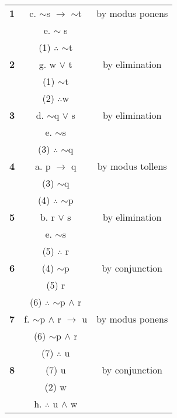 \documentclass{article}
\begin{document}
\begin{center}
	\begin{tabular}{ |c|c|c| } 
		\hline
		\textbf{1}  & c. $\sim$s $\rightarrow$ $\sim$t  & by modus ponens \\ 
					& e. $\sim$ s & \\
					& (1) $\therefore$ $\sim$t & \\
		\hline
		\textbf{2} & g. w $\vee$ t & by elimination \\ 
				   & (1) $\sim$t & \\
				   & (2) $\therefore$w & \\
		\hline
		\textbf{3} & d. $\sim$q $\vee$ s & by elimination \\ 
			 	   & e. $\sim$s & \\
				   & (3) $\therefore$ $\sim$q & \\
		\hline
		\textbf{4} & a. p $\rightarrow$ q & by modus tollens \\ 
				   & (3) $\sim$q & \\
				   & (4) $\therefore$ $\sim$p & \\
		\hline
		\textbf{5} & b. r $\vee$ s & by elimination \\ 
				   & e. $\sim$s & \\
				   & (5) $\therefore$ r & \\
		\hline
		\textbf{6} & (4) $\sim$p & by conjunction \\ 
				   & (5) r & \\
				   & (6) $\therefore$ $\sim$p $\wedge$ r & \\
		\hline
		\textbf{7} & f. $\sim$p $\wedge$ r $\rightarrow$ u & by modus ponens \\ 
				   & (6) $\sim$p $\wedge$ r & \\
				   & (7) $\therefore$ u & \\
		\hline
		\textbf{8} & (7) u & by conjunction \\ 
				   & (2) w & \\
		           & h. $\therefore$ u $\wedge$ w & \\
		\hline
	\end{tabular}
\end{center}
\end{document}
